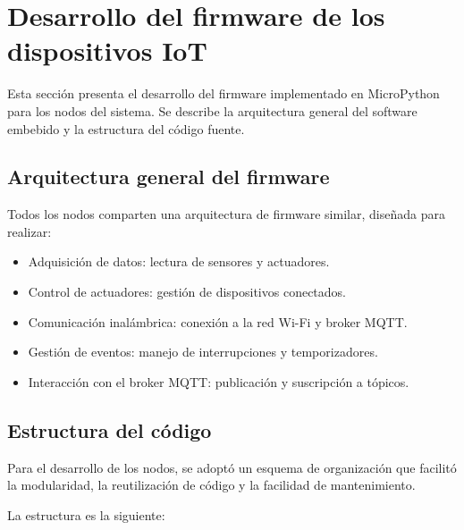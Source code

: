 \section{Desarrollo del firmware de los dispositivos IoT}

Esta sección presenta el desarrollo del firmware implementado en MicroPython
para los nodos del sistema. Se describe la arquitectura general del software
embebido y la estructura del código fuente.

\subsection{Arquitectura general del firmware}

Todos los nodos comparten una arquitectura de firmware similar, diseñada para
realizar:

\begin{itemize}
    \item Adquisición de datos: lectura de sensores y actuadores.
    \item Control de actuadores: gestión de dispositivos conectados.
    \item Comunicación inalámbrica: conexión a la red Wi-Fi y broker MQTT.
    \item Gestión de eventos: manejo de interrupciones y temporizadores.
    \item Interacción con el broker MQTT: publicación y suscripción a tópicos.
\end{itemize}


\subsection{Estructura del código}

Para el desarrollo de los nodos, se adoptó un esquema de organización que
facilitó la modularidad, la reutilización de código y la facilidad de
mantenimiento.

La estructura es la siguiente:

